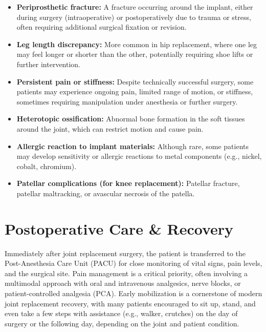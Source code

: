 \begin{itemize}
\begin{itemize}
      \item \textbf{Periprosthetic fracture:} A fracture occurring around the implant, either during surgery (intraoperative) or postoperatively due to trauma or stress, often requiring additional surgical fixation or revision.
      \item \textbf{Leg length discrepancy:} More common in hip replacement, where one leg may feel longer or shorter than the other, potentially requiring shoe lifts or further intervention.
      \item \textbf{Persistent pain or stiffness:} Despite technically successful surgery, some patients may experience ongoing pain, limited range of motion, or stiffness, sometimes requiring manipulation under anesthesia or further surgery.
      \item \textbf{Heterotopic ossification:} Abnormal bone formation in the soft tissues around the joint, which can restrict motion and cause pain.
      \item \textbf{Allergic reaction to implant materials:} Although rare, some patients may develop sensitivity or allergic reactions to metal components (e.g., nickel, cobalt, chromium).
      \item \textbf{Patellar complications (for knee replacement):} Patellar fracture, patellar maltracking, or avascular necrosis of the patella.
    \end{itemize}
\end{itemize}

\section*{Postoperative Care \& Recovery}
Immediately after joint replacement surgery, the patient is transferred to the Post-Anesthesia Care Unit (PACU) for close monitoring of vital signs, pain levels, and the surgical site. Pain management is a critical priority, often involving a multimodal approach with oral and intravenous analgesics, nerve blocks, or patient-controlled analgesia (PCA). Early mobilization is a cornerstone of modern joint replacement recovery, with many patients encouraged to sit up, stand, and even take a few steps with assistance (e.g., walker, crutches) on the day of surgery or the following day, depending on the joint and patient condition.


